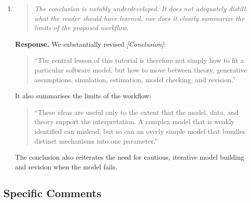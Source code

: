 \documentclass[11pt]{article}
\newcommand{\response}{\textbf{Response.} }
\newcommand{\secit}[1]{\textit{[#1]}}
\newcommand{\msq}[1]{\begin{quote}\small\noindent``#1''\end{quote}}
\newenvironment{reviewerpoint}{\begin{quote}\itshape}{\end{quote}}
\begin{document}
\begin{enumerate}[label=\textbf{Reviewer 2, Main Concern \arabic*.}]
\response We cautiously acknowledge this concern. but emphasise that the article is intended as a tutorial that walks through the details of a model-building workflow -- we are not aiming 
only for conceptual value but very practical support.
We have made targeted revisions rather than removing core tutorial detail: clearer structure and reader guidance in \secit{Scope and Outline}, a more explicit workflow in \secit{Introduction}, and condensation of repetitive code- and plot-heavy passages (see our response to Editor Comment 1).
\item

\begin{reviewerpoint}
The conclusion is notably underdeveloped.
It does not adequately distill what the reader should have learned, nor does it clearly summarize the limits of the proposed workflow.
\end{reviewerpoint}

\response We substantially revised \secit{Conclusion}:
\msq{The central lesson of this tutorial is therefore not simply how to fit a particular software model, but how to move between theory, generative assumptions, simulation, estimation, model checking, and revision.}
It also summarises the limits of the workflow:
\msq{These ideas are useful only to the extent that the model, data, and theory support the interpretation.
A complex model that is weakly identified can mislead, but so can an overly simple model that bundles distinct mechanisms into one parameter.}
The conclusion also reiterates the need for cautious, iterative model building and revision when the model fails.
\end{enumerate}

\subsection*{Specific Comments}
\end{document}
